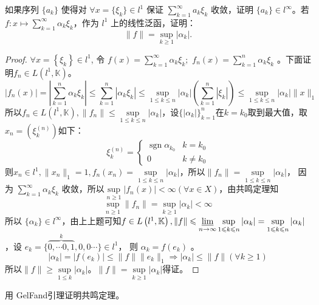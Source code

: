 \documentclass[lang=cn,newtx,10pt,scheme=chinese,thmcnt=chapter]{elegantbook}
\begin{document}
\begin{problem}
如果序列 $\{a_k\}$ 使得对 $\forall x = \{\xi_k\} \in l^1$ 保证 $\sum\limits_{k=1}^{\infty} a_k \xi_k$ 收敛，证明 $\{a_k\} \in l^{\infty}$。若 $f: x \mapsto \sum\limits_{k=1}^{\infty} \alpha_k \xi_k$，作为 $l^1$ 上的线性泛函，证明：
\[
\|f\| = \sup_{k \geqslant 1} |\alpha_k|.
\]
\end{problem}
\begin{proof}
     $\forall x=\left\{\xi_k\right\} \in l^1$, 令 $f(x)=\sum\limits_{k=1}^{\infty} \alpha_k \xi_k ;$ $f_n(x)=\sum\limits_{k=1}^n \alpha_k \xi_k$ 。下面证明$f_n \in {L} \left(l^1,\mathbb{ K} \right)$。
\[|f_n(x)|=|\sum\limits_{k=1}^n \alpha_k \xi_k|\leqslant \sum\limits_{k=1}^n |\alpha_k \xi_k|\leqslant\sup\limits_{1\leqslant k\leqslant n}|\alpha_k|\left(\sum\limits_{k=1}^n \left|\xi_k\right| \right)\leqslant\sup\limits_{1\leqslant k\leqslant n}|\alpha_k|\|x\|_1\]
    所以$f_n \in {L} \left(l^1,\mathbb{ K} \right),\|f_n\|\leqslant\sup\limits_{1\leqslant k\leqslant n}|\alpha_k|$，设$\{|\alpha_k|\}_{k=1}^n$在$k=k_0$取到最大值，取$x_n=(\xi^{(n)}_k)$如下：
\[\xi_k^{(n)}=\begin{cases}
        \operatorname{sgn}\alpha_{k_0}&k=k_0\\
         0&k\neq k_0
     \end{cases}\]
则$x_n\in l^1,\|x_n\|_1=1,f_n(x_n)=\sup\limits_{1\leqslant k\leqslant n}|\alpha_k|$，所以$\|f_n\|=\sup\limits_{1\leqslant k\leqslant n}|\alpha_k|$， 因为 $\sum\limits_{k=1}^{\infty} \alpha_k \xi_k$ 收敛，所以$\sup\limits_{n\geqslant 1}|f_n(x)|<\infty(\forall x\in{X}
)$，由共鸣定理知
\[\sup\limits_{n\geqslant 1}\|f_n\|= \sup_{k \geqslant 1} |\alpha_k|<\infty\]
所以 $\{\alpha_k\} \in l^\infty$，由上上题可知$f\in {L} \left(l^1,\mathbb{ K} \right),\|f\|\leqslant\varliminf\limits_{n\to \infty}\sup\limits_{1\leqslant k\leqslant n}|\alpha_k|=\sup\limits_{1\leqslant k\leqslant n}|\alpha_k| $，设 $e _k=\{\overbrace{0, \cdots 0,1}^k,0,0 \cdots\} \in l^1$， 则 $\alpha_k=f\left( e _k\right)$ 。
\begin{equation*}
\left|\alpha_k\right|=\left|f\left( e _k\right)\right| \leqslant\|f\| \| e _k\|_1\Rightarrow |\alpha_k|\leqslant \|f\|(\forall k\geqslant 1)
\end{equation*}
所以$\|f\|\geqslant\sup\limits_{1\leqslant k}|\alpha_k| $。$
\|f\| = \sup\limits_{k \geqslant 1} |\alpha_k|
$得证。
     
\end{proof}

\begin{problem}
用 GelFand引理证明共鸣定理。
\end{problem}
\end{document}
